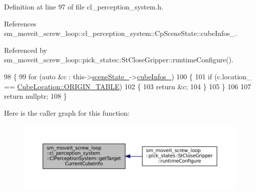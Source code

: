 Definition at line 97 of file cl\+\_\+perception\+\_\+system.\+h.



References sm\+\_\+moveit\+\_\+screw\+\_\+loop\+::cl\+\_\+perception\+\_\+system\+::\+Cp\+Scene\+State\+::cube\+Infos\+\_\+.



Referenced by sm\+\_\+moveit\+\_\+screw\+\_\+loop\+::pick\+\_\+states\+::\+St\+Close\+Gripper\+::runtime\+Configure().


\begin{DoxyCode}
98             \{
99                 \textcolor{keywordflow}{for} (\textcolor{keyword}{auto} &c : this->\hyperlink{classsm__moveit__screw__loop_1_1cl__perception__system_1_1ClPerceptionSystem_abb08b3cc6d4ec414a608da92133b1f66}{sceneState\_}->\hyperlink{classsm__moveit__screw__loop_1_1cl__perception__system_1_1CpSceneState_afef6eaf7eb94cf74b9333a373b2fb35d}{cubeInfos\_})
100                 \{
101                     \textcolor{keywordflow}{if} (c.location\_ == \hyperlink{namespacesm__moveit__screw__loop_1_1cl__perception__system_a3685ee11048648ccb59214d2341fb8caae5ee34c3ef8ec4a46a00a218416c7b1d}{CubeLocation::ORIGIN\_TABLE})
102                     \{
103                         \textcolor{keywordflow}{return} &c;
104                     \}
105                 \}
106 
107                 \textcolor{keywordflow}{return} \textcolor{keyword}{nullptr};
108             \}
\end{DoxyCode}
Here is the caller graph for this function\+:
\nopagebreak
\begin{figure}[H]
\begin{center}
\leavevmode
\includegraphics[width=350pt]{classsm__moveit__screw__loop_1_1cl__perception__system_1_1ClPerceptionSystem_ad9231b87b9592cc5c847ce1b92a75446_icgraph}
\end{center}
\end{figure}
\mbox{\label{classsm__moveit__screw__loop_1_1cl__perception__system_1_1ClPerceptionSystem_aaef94ec7b4e2e9249829d4b24ad2499e}} 

